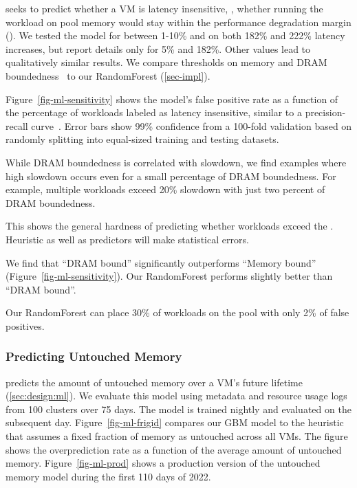 \sys seeks to predict whether a VM is latency insensitive, \ie,
whether running the workload on pool memory would stay within the performance
degradation margin (\pdm).
We tested the model for \pdm between 1-10\% and on both 182\% and 222\% latency increases, but report details only for 5\% and 182\%.
Other \pdm values lead to qualitatively similar results.
We compare thresholds on
memory and DRAM boundedness~\cite{topdownanalysis.ispass14, tmam.web21} to
our RandomForest (\sec\ref{sec-impl}).

Figure~\ref{fig-ml-sensitivity}
shows the model's false positive rate as a function of the percentage of workloads
labeled as latency insensitive, similar to a precision-recall
curve~\cite{buckland1994relationship}.
Error bars show 99\% confidence from a 100-fold validation based on randomly
splitting into equal-sized training and testing datasets.

\myfinding{} While DRAM boundedness is correlated with
slowdown, we find examples where high slowdown occurs even for a small
percentage of DRAM boundedness. For example, multiple workloads exceed
20\% slowdown with just two percent of DRAM boundedness.

This shows the general hardness of predicting whether workloads exceed the \pdm.
Heuristic as well as predictors will make statistical errors.


\myfinding{}
We find that ``DRAM bound'' significantly outperforms ``Memory bound'' (Figure~\ref{fig-ml-sensitivity}).
Our RandomForest performs slightly better than ``DRAM bound''.

Our RandomForest can place 30\% of workloads on the pool with only 2\% of false positives.





\vfive\subsubsection{Predicting Untouched Memory}\label{eval:untouched}

\sys predicts the amount of untouched memory over a VM's future lifetime (\sec\ref{sec:design:ml}).
We evaluate this model using metadata and resource usage logs from 100 clusters over 75 days.
The model is trained nightly and evaluated on the subsequent day.
Figure~\ref{fig-ml-frigid} compares our GBM model to the heuristic that assumes a fixed fraction of memory as untouched across all VMs.
The figure shows the overprediction rate as a function of the average amount of untouched memory.
Figure~\ref{fig-ml-prod} shows a production version of the untouched memory model during the first 110 days of 2022.

